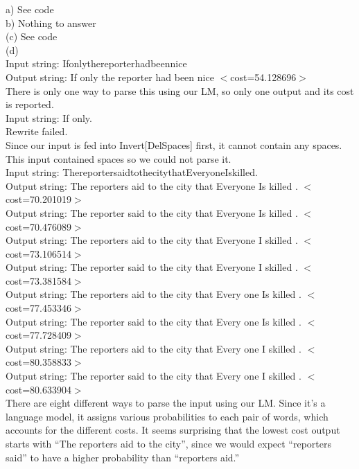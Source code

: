 \documentclass[11pt]{article} %
\begin{document}
a) See code\\

b) Nothing to answer\\

(c) See code\\


(d) \\
Input string: Ifonlythereporterhadbeennice\\
Output string: If only the reporter had been nice $<$cost=54.128696$>$\\

There is only one way to parse this using our LM, so only one output and its cost is reported.\\

Input string: If only.\\
Rewrite failed.\\

Since our input is fed into Invert[DelSpaces] first, it cannot contain any spaces. This input contained spaces so we could not parse it.\\

Input string: ThereportersaidtothecitythatEveryoneIskilled.\\
Output string: The reporters aid to the city that Everyone Is killed . $<$cost=70.201019$>$\\
Output string: The reporter said to the city that Everyone Is killed . $<$cost=70.476089$>$\\
Output string: The reporters aid to the city that Everyone I skilled . $<$cost=73.106514$>$\\
Output string: The reporter said to the city that Everyone I skilled . $<$cost=73.381584$>$\\
Output string: The reporters aid to the city that Every one Is killed . $<$cost=77.453346$>$\\
Output string: The reporter said to the city that Every one Is killed . $<$cost=77.728409$>$\\
Output string: The reporters aid to the city that Every one I skilled . $<$cost=80.358833$>$\\
Output string: The reporter said to the city that Every one I skilled . $<$cost=80.633904$>$\\

There are eight different ways to parse the input using our LM. Since it’s a language model, it assigns various probabilities to each pair of words, which accounts for the different costs. It seems surprising that the lowest cost output starts with ``The reporters aid to the city”, since we would expect ``reporters said” to have a higher probability than ``reporters aid.” \\
\end{document}
